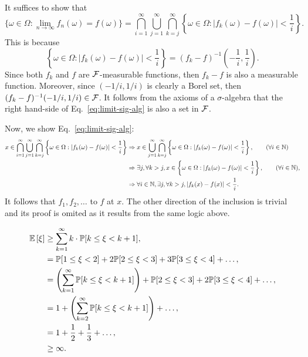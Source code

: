 \begin{problem}{1}
\end{problem}
\begin{solution}
    It suffices to show that 
    \begin{equation}\label{eq:limit-sig-alg}
        \{\omega \in \Omega: \lim_{n\to\infty} f_n(\omega) = f(\omega)\} = \bigcap_{i=1}^\infty \bigcup_{j=1}^\infty \bigcap_{k=j}^\infty \left\{\omega \in \Omega : |f_k(\omega) - f(\omega)| < \frac{1}{i}\right\}.
    \end{equation}
    This is because
    \[
        \left\{\omega \in \Omega : |f_k(\omega) - f(\omega)| < \frac{1}{i}\right\} =  (f_k - f)^{-1}\left(-\frac{1}{i},\frac{1}{i}\right).
    \]
    Since both $f_k$ and $f$ are $\mathcal{F}$-measurable functions, then $f_k - f$ is also a measurable function. Moreover, since $(-1/i, 1/i)$ is clearly a Borel set, then $(f_k - f)^{-1}(-1/i, 1/i) \in \mathcal{F}$. It follows from the axioms of a $\sigma$-algebra that the right hand-side of Eq.~\ref{eq:limit-sig-alg} is also a set in $\mathcal{F}$. 

    Now, we show Eq.~\ref{eq:limit-sig-alg}:
    \begin{align*}
        x \in \bigcap_{i=1}^\infty \bigcup_{j=1}^\infty \bigcap_{k=j}^\infty \left\{\omega \in \Omega : |f_k(\omega) - f(\omega)| < \frac{1}{i}\right\} &\Rightarrow x \in \bigcup_{j=1}^\infty\bigcap_{k=j}^\infty \left\{\omega \in \Omega : |f_k(\omega) - f(\omega)| <  \frac{1}{i}\right\}, \tag{$\forall i \in \N$} \\
        &\Rightarrow \exists j, \forall k > j, x\in \left\{\omega \in \Omega : |f_k(\omega) - f(\omega)| <  \frac{1}{i}\right\}, \tag{$\forall i \in \N$}, \\
        &\Rightarrow \forall i \in \N, \exists j, \forall k > j, |f_k(x) - f(x)| < \frac{1}{i}.
    \end{align*}
    It follows that $f_1,f_2,\ldots$ to $f$ at $x$. The other direction of the inclusion is trivial and its proof is omited as it results from the same logic above.
\end{solution}

\begin{problem}{2}
\end{problem}
\begin{solution}
    \begin{align*}
        \mathbb{E}\left[\xi\right] &\geq \sum_{k=1}^\infty k\cdot \mathbb{P}[k \leq \xi < k + 1], \\
        &= \mathbb{P}[1 \leq \xi < 2] + 2\mathbb{P}[2 \leq \xi < 3] + 3\mathbb{P}[3 \leq \xi < 4] + \ldots, \\
        &= \left(\sum_{k=1}^\infty \mathbb{P}[k \leq \xi < k+1]\right) + \mathbb{P}[2\leq \xi < 3] + 2\mathbb{P}[3 \leq \xi < 4] + \ldots, \\
        &= 1 + \left(\sum_{k=2}^\infty \mathbb{P}[k \leq \xi < k+1]\right) + \ldots, \\
        &= 1 + \frac{1}{2} + \frac{1}{3} + \ldots, \\
        &\geq \infty.
    \end{align*}
\end{solution}

